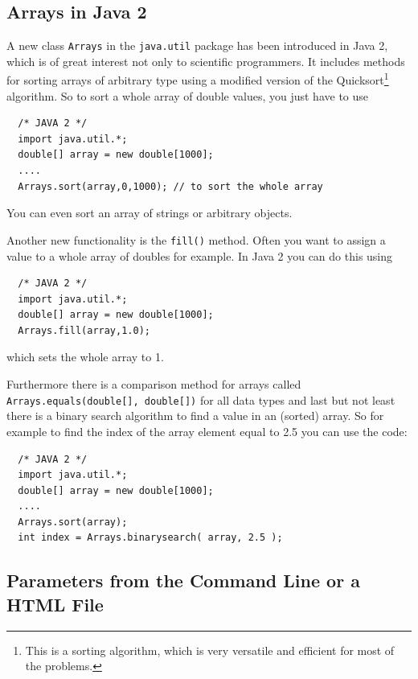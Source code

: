 \subsection{Arrays in Java 2}
A new class \verb|Arrays| in the \verb|java.util| package has been
introduced in Java 2, which is of great interest not only to scientific
programmers. It includes methods for sorting arrays of arbitrary
type using a modified version of the Quicksort\footnote{This is
a sorting algorithm, which is very versatile and efficient for
most of the problems.} algorithm. So to sort a whole array 
of double values, you just have to use
\begin{verbatim}
  /* JAVA 2 */
  import java.util.*;
  double[] array = new double[1000];
  ....
  Arrays.sort(array,0,1000); // to sort the whole array
\end{verbatim}
You can even sort an array of strings or arbitrary objects.

Another new functionality is the \verb|fill()| method. Often you
want to assign a value to a whole array of doubles for example.
In Java 2 you can do this using
\begin{verbatim}
  /* JAVA 2 */
  import java.util.*;
  double[] array = new double[1000];
  Arrays.fill(array,1.0);
\end{verbatim}
which sets the whole array to 1.

Furthermore there is a comparison method for arrays called
\verb|Arrays.equals(double[], double[])| for all data types and
last but not least there is a binary search algorithm to
find a value in an (sorted) array. So for example to find the index of the
array element equal to 2.5 you can use the code:
\begin{verbatim}
  /* JAVA 2 */
  import java.util.*;
  double[] array = new double[1000];
  ....
  Arrays.sort(array);
  int index = Arrays.binarysearch( array, 2.5 );
\end{verbatim}

\subsection{Parameters from the Command Line or a HTML File}
\label{sec:Parameter}


